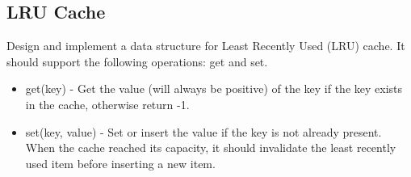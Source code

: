 \documentclass[11pt]{book}
\begin{document}
\subsection{LRU Cache}
\label{sec-19-2-1}
Design and implement a data structure for Least Recently Used (LRU) cache. It should support the following operations: get and set.
\begin{itemize}
\item get(key) - Get the value (will always be positive) of the key if the key exists in the cache, otherwise return -1.
\item set(key, value) - Set or insert the value if the key is not already
present. When the cache reached its capacity, it should invalidate
the least recently used item before inserting a new item.
\end{itemize}
\lstset{language=java,label= ,caption= ,numbers=none}
\end{document}
